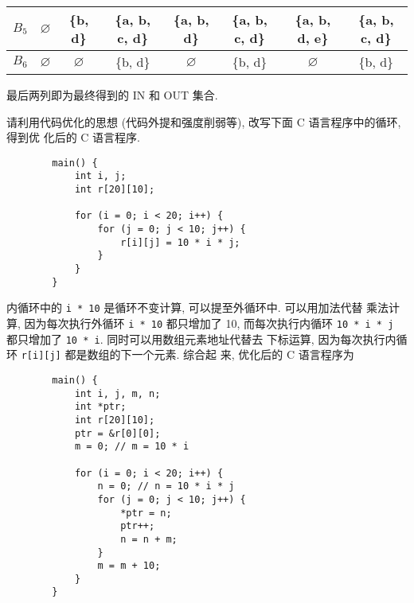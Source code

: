 \documentclass[boxes]{homework}
\begin{document}
\begin{solution}
\begin{center}
{\begin{tabular}{|c|c|c|c|c|c|c|c|}
                $B_{5}$ & $\varnothing$     & \{b, d\}           & \{a, b, c, d\}    & \{a, b, d\}        & \{a, b, c, d\}    & \{a, b, d, e\}     & \{a, b, c, d\}    \\ \hline
                $B_{6}$ & $\varnothing$     & $\varnothing$      & \{b, d\}          & $\varnothing$      & \{b, d\}          & $\varnothing$      & \{b, d\}          \\ \hline
            \end{tabular}
        }
    \end{center}
    最后两列即为最终得到的 IN 和 OUT 集合.
\end{solution}

\begin{problem}
请利用代码优化的思想 (代码外提和强度削弱等), 改写下面 C 语言程序中的循环, 得到优
化后的 C 语言程序.
\begin{verbatim}
        main() {
            int i, j;
            int r[20][10];

            for (i = 0; i < 20; i++) {
                for (j = 0; j < 10; j++) {
                    r[i][j] = 10 * i * j;
                }
            }
        }
    \end{verbatim}
\end{problem}
\begin{solution}
    内循环中的 \texttt{i * 10} 是循环不变计算, 可以提至外循环中. 可以用加法代替
    乘法计算, 因为每次执行外循环 \texttt{i * 10} 都只增加了 10, 而每次执行内循环
    \texttt{10 * i * j} 都只增加了 \texttt{10 * i}. 同时可以用数组元素地址代替去
    下标运算, 因为每次执行内循环 \texttt{r[i][j]} 都是数组的下一个元素. 综合起
    来, 优化后的 C 语言程序为
    \begin{verbatim}
        main() {
            int i, j, m, n;
            int *ptr;
            int r[20][10];
            ptr = &r[0][0];
            m = 0; // m = 10 * i

            for (i = 0; i < 20; i++) {
                n = 0; // n = 10 * i * j
                for (j = 0; j < 10; j++) {
                    *ptr = n;
                    ptr++;
                    n = n + m;
                }
                m = m + 10;
            }
        }
    \end{verbatim}
\end{solution}
\end{document}
